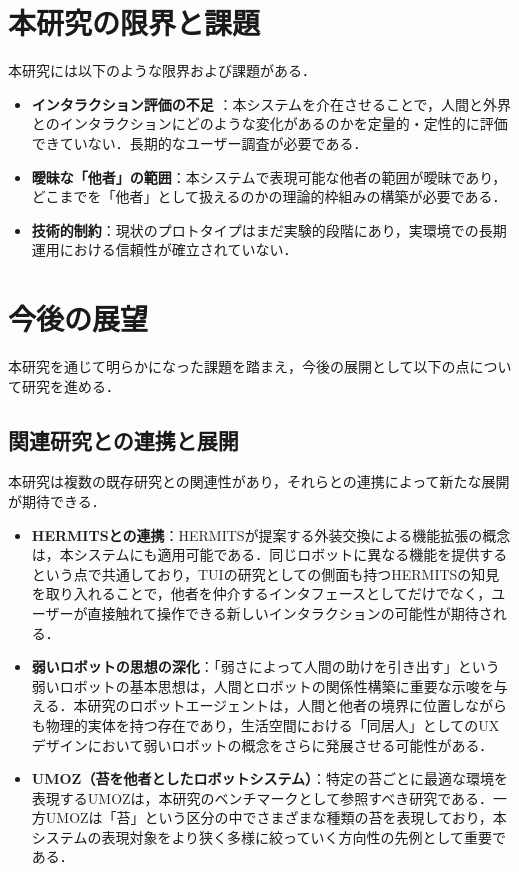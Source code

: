 \documentclass{cuxarticle}
\begin{document}
\section{本研究の限界と課題}
本研究には以下のような限界および課題がある．

\begin{itemize}
  \item \textbf{インタラクション評価の不足} ：本システムを介在させることで，人間と外界とのインタラクションにどのような変化があるのかを定量的・定性的に評価できていない．長期的なユーザー調査が必要である．
  \item \textbf{曖昧な「他者」の範囲}：本システムで表現可能な他者の範囲が曖昧であり，どこまでを「他者」として扱えるのかの理論的枠組みの構築が必要である．
  \item \textbf{技術的制約}：現状のプロトタイプはまだ実験的段階にあり，実環境での長期運用における信頼性が確立されていない．
\end{itemize}

\section{今後の展望}
本研究を通じて明らかになった課題を踏まえ，今後の展開として以下の点について研究を進める．

\subsection{関連研究との連携と展開}
本研究は複数の既存研究との関連性があり，それらとの連携によって新たな展開が期待できる．

\begin{itemize}
  \item \textbf{HERMITSとの連携}：HERMITS\cite{--HERMITSProceedings33rdAnnual}が提案する外装交換による機能拡張の概念は，本システムにも適用可能である．同じロボットに異なる機能を提供するという点で共通しており，TUIの研究としての側面も持つHERMITSの知見を取り入れることで，他者を仲介するインタフェースとしてだけでなく，ユーザーが直接触れて操作できる新しいインタラクションの可能性が期待される．
  \item \textbf{弱いロボットの思想の深化}：「弱さによって人間の助けを引き出す」という弱いロボットの基本思想は，人間とロボットの関係性構築に重要な示唆を与える．本研究のロボットエージェントは，人間と他者の境界に位置しながらも物理的実体を持つ存在であり，生活空間における「同居人」としてのUXデザインにおいて弱いロボットの概念をさらに発展させる可能性がある．
  \item \textbf{UMOZ（苔を他者としたロボットシステム）}：特定の苔ごとに最適な環境を表現するUMOZ\cite{--GADARA}は，本研究のベンチマークとして参照すべき研究である．一方UMOZは「苔」という区分の中でさまざまな種類の苔を表現しており，本システムの表現対象をより狭く多様に絞っていく方向性の先例として重要である．
\end{itemize}
\end{document}
